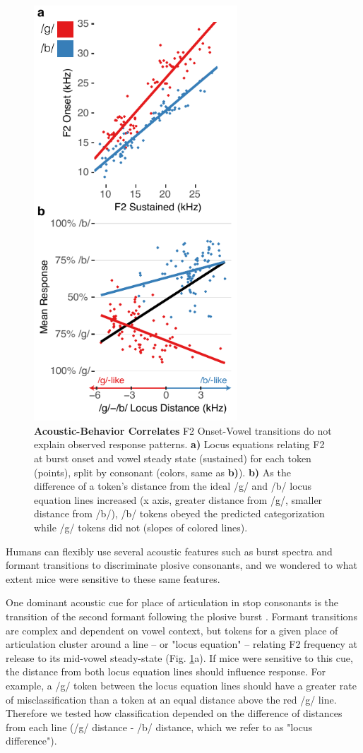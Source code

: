 \begin{figure}[h!]
\includegraphics[width=3in]{speech/figures/Figure5.pdf}
\caption{\textbf{Acoustic-Behavior Correlates} F2 Onset-Vowel transitions do not explain observed response patterns. \textbf{a)} Locus equations relating F2 at burst onset and vowel steady state (sustained) for each token (points), split by consonant (colors, same as \textbf{b)}). \textbf{b)} As the difference of a token's distance from the ideal /g/ and /b/ locus equation lines increased (x axis, greater distance from /g/, smaller distance from /b/), /b/ tokens obeyed the predicted categorization while /g/ tokens did not (slopes of colored lines).}
\label{acoustic}
\end{figure}

Humans can flexibly use several acoustic features such as burst spectra and formant transitions to discriminate plosive consonants, and we wondered to what extent mice were sensitive to these same features.

One dominant acoustic cue for place of articulation in stop consonants is the transition of the second formant following the plosive burst \citep{wrightReviewPerceptualCues2004,Sussman1998,Lindblom2012}. Formant transitions are complex and dependent on vowel context, but tokens for a given place of articulation cluster around a line -- or "locus equation" -- relating F2 frequency at release to its mid-vowel steady-state \citep{Sussman1998,Lindblom2012} (Fig. \ref{acoustic}a).  If mice were sensitive to this cue, the distance from both locus equation lines should influence response. For example, a /g/ token between the locus equation lines should have a greater rate of misclassification than a token at an equal distance above the red /g/ line. Therefore we tested how classification depended on the difference of distances from each line (/g/ distance - /b/ distance, which we refer to as "locus difference").

